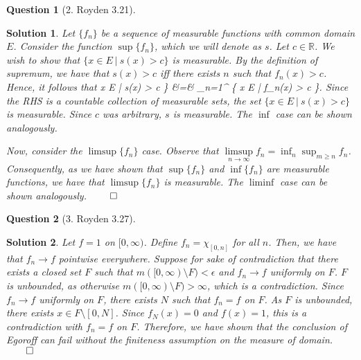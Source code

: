 \documentclass{article} %
\def\eQb#1\eQe{\begin{eqnarray*}#1\end{eqnarray*}}
\theoremstyle{quest}
\newtheorem*{question}{Question}
\newtheorem*{solution}{Solution}
\begin{document}
\pagebreak

\begin{question}[2. Royden 3.21]
\end{question}
\begin{solution}
Let $\{f_n \}$ be a sequence of measurable functions with common domain $E$. Consider the
function $\sup \{ f_n \}$, which we will denote as $s$. Let $c \in \mathbb{R}$. 
We wish to show that $\{ x \in E \> | \> s(x) > c\}$ is measurable. By the definition of supremum,
we have that $s(x) > c$ iff there exists $n$ such that $f_n(x) > c$. Hence, it follows that 
\eQb
\{ x \in E \> | \> s(x) > c \} &=& \bigcup_{n=1}^{\infty} 
\{ x \in E \> | \> f_n(x) > c \}. 
\eQe
Since the RHS is a countable collection of measurable sets, the set 
$\{ x \in E \> | \> s(x) > c \}$ is measurable. Since $c$ was arbitrary, $s$ is measurable. 
The $\inf$ case can be shown analogously.

\smallskip

Now, consider the $\limsup \{ f_n \} $ case. 
Observe that $\underset{n \to \infty}{\limsup}f_n = \inf_{n} 
\sup_{m \geq n}f_n$. Consequently, as we have shown that $\sup\{f_n\}$ and $\inf\{f_n\}$ are 
measurable functions, we have that $\limsup \{ f_n \}$ is measurable. The $\liminf$ case can 
be shown analogously. $\qed$
\end{solution}

\bigskip

\begin{question}[3. Royden 3.27]
\end{question}
\begin{solution}
Let $f = 1$ on $[0,\infty)$. Define $f_n = \chi_{[0,n]}$ for all $n$. Then, we have that
$f_n \to f$ pointwise everywhere. Suppose for sake of contradiction that there exists a 
closed set $F$ such that $m([0,\infty) \setminus F) < \epsilon$ and $f_n \to f$ uniformly on $F$. 
$F$ is unbounded, as otherwise $m([0,\infty ) \setminus F) > \infty$, which is a contradiction.
Since $f_n \to f$ uniformly on $F$, there exists $N$ such that $f_n = f$ on $F$. As $F$ is unbounded,
there exists $x \in F\setminus [0,N]$. Since $f_N(x) = 0$ and $f(x) = 1$, this is a contradiction
with $f_n = f$ on $F$. Therefore, we have shown that the conclusion of Egoroff can fail
without the finiteness assumption on the measure of domain. $\qed$
\end{solution}

\bigskip
\end{document}
